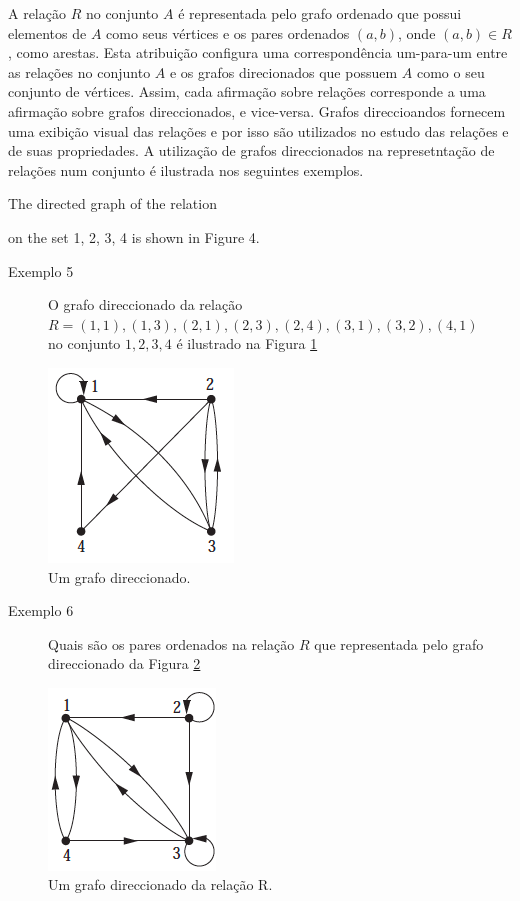 A relação $R$ no conjunto $A$ é representada pelo grafo ordenado que possui elementos de $A$ como seus vértices e os pares 
ordenados $(a,b)$, onde $(a,b) \in R$, como arestas. Esta atribuição configura uma correspondência um-para-um entre as relações
no conjunto $A$ e os grafos direcionados que possuem $A$ como o seu conjunto de vértices. Assim, cada afirmação sobre relações
corresponde a uma afirmação sobre grafos direccionados, e vice-versa. Grafos direccioandos fornecem uma exibição visual das
relações e por isso são utilizados no estudo das relações e de suas propriedades. A utilização de grafos direccionados 
na represetntação de relações num conjunto é ilustrada nos seguintes exemplos.

The directed graph of the relation

on the set {1, 2, 3, 4} is shown in Figure 4.


\begin{description}
	\item[Exemplo 5]{
	O grafo direccionado da relação\\
	$R = {(1, 1), (1, 3), (2, 1), (2, 3), (2, 4), (3, 1), (3, 2), (4, 1)}$\\
	no conjunto ${1, 2, 3, 4}$ é ilustrado na Figura \ref{Figura64}
	}
\end{description}

\begin{figure}[H]
	\centering
	\includegraphics[scale=0.75]{aulas/imagens/64}
	\caption{Um grafo direccionado.}
	\label{Figura64}
\end{figure}

\begin{description}
	\item[Exemplo 6]{
	Quais são os pares ordenados na relação $R$ que representada pelo grafo direccionado da Figura \ref{Figura65}}
\end{description}

\begin{figure}[H]
	\centering
	\includegraphics[scale=0.75]{aulas/imagens/65}
	\caption{Um grafo direccionado da relação R.}
	\label{Figura65}
\end{figure}

